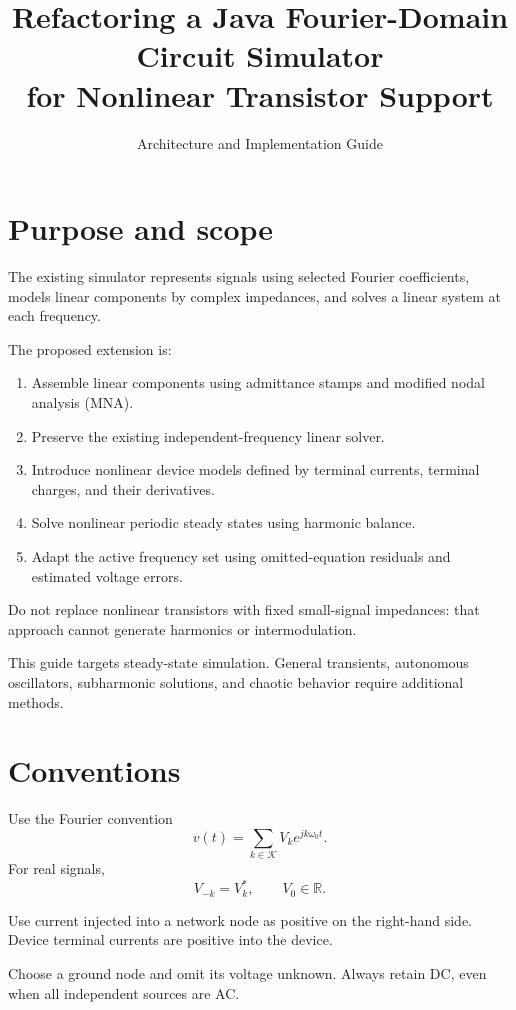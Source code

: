 \documentclass[11pt,a4paper]{article}
\title{Refactoring a Java Fourier-Domain Circuit Simulator\\
for Nonlinear Transistor Support}
\author{Architecture and Implementation Guide}
\date{}
\begin{document}
\maketitle

\section{Purpose and scope}

The existing simulator represents signals using selected Fourier
coefficients, models linear components by complex impedances, and solves
a linear system at each frequency.

The proposed extension is:
\begin{enumerate}
  \item Assemble linear components using admittance stamps and modified
        nodal analysis (MNA).
  \item Preserve the existing independent-frequency linear solver.
  \item Introduce nonlinear device models defined by terminal currents,
        terminal charges, and their derivatives.
  \item Solve nonlinear periodic steady states using harmonic balance.
  \item Adapt the active frequency set using omitted-equation residuals
        and estimated voltage errors.
\end{enumerate}

Do not replace nonlinear transistors with fixed small-signal impedances:
that approach cannot generate harmonics or intermodulation.

This guide targets steady-state simulation. General transients,
autonomous oscillators, subharmonic solutions, and chaotic behavior
require additional methods.

\section{Conventions}

Use the Fourier convention
\[
  v(t)=\sum_{k\in\mathcal K}V_k e^{j k\omega_0t}.
\]
For real signals,
\[
  V_{-k}=V_k^*, \qquad V_0\in\mathbb R.
\]

Use current injected into a network node as positive on the
right-hand side. Device terminal currents are positive into the device.

Choose a ground node and omit its voltage unknown. Always retain DC,
even when all independent sources are AC.
\end{document}
